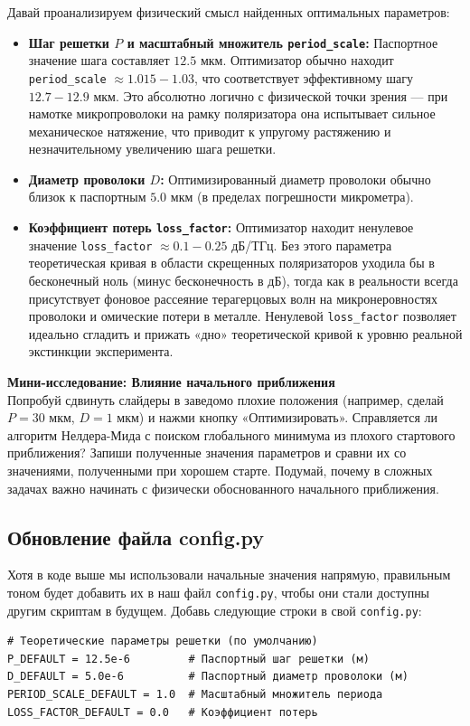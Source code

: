 Давай проанализируем физический смысл найденных оптимальных параметров:
\begin{itemize}
    \item \textbf{Шаг решетки $P$ и масштабный множитель \texttt{period\_scale}:} Паспортное значение шага составляет $12.5$ мкм. Оптимизатор обычно находит \texttt{period\_scale} $\approx 1.015 - 1.03$, что соответствует эффективному шагу $12.7 - 12.9$ мкм. Это абсолютно логично с физической точки зрения — при намотке микропроволоки на рамку поляризатора она испытывает сильное механическое натяжение, что приводит к упругому растяжению и незначительному увеличению шага решетки.
    
    \item \textbf{Диаметр проволоки $D$:} Оптимизированный диаметр проволоки обычно близок к паспортным $5.0$ мкм (в пределах погрешности микрометра).
    
    \item \textbf{Коэффициент потерь \texttt{loss\_factor}:} Оптимизатор находит ненулевое значение \texttt{loss\_factor} $\approx 0.1 - 0.25$ дБ/ТГц. Без этого параметра теоретическая кривая в области скрещенных поляризаторов уходила бы в бесконечный ноль (минус бесконечность в дБ), тогда как в реальности всегда присутствует фоновое рассеяние терагерцовых волн на микронеровностях проволоки и омические потери в металле. Ненулевой \texttt{loss\_factor} позволяет идеально сгладить и прижать «дно» теоретической кривой к уровню реальной экстинкции эксперимента.
\end{itemize}

\begin{minitaskbox}
\textbf{Мини-исследование: Влияние начального приближения}
\\
Попробуй сдвинуть слайдеры в заведомо плохие положения (например, сделай $P = 30$ мкм, $D = 1$ мкм) и нажми кнопку «Оптимизировать». Справляется ли алгоритм Нелдера-Мида с поиском глобального минимума из плохого стартового приближения? Запиши полученные значения параметров и сравни их со значениями, полученными при хорошем старте. Подумай, почему в сложных задачах важно начинать с физически обоснованного начального приближения.
\end{minitaskbox}

\subsection{Обновление файла config.py}
Хотя в коде выше мы использовали начальные значения напрямую, правильным тоном будет добавить их в наш файл \texttt{config.py}, чтобы они стали доступны другим скриптам в будущем.
Добавь следующие строки в свой \texttt{config.py}:
\begin{verbatim}
# Теоретические параметры решетки (по умолчанию)
P_DEFAULT = 12.5e-6         # Паспортный шаг решетки (м)
D_DEFAULT = 5.0e-6          # Паспортный диаметр проволоки (м)
PERIOD_SCALE_DEFAULT = 1.0  # Масштабный множитель периода
LOSS_FACTOR_DEFAULT = 0.0   # Коэффициент потерь
\end{verbatim}

